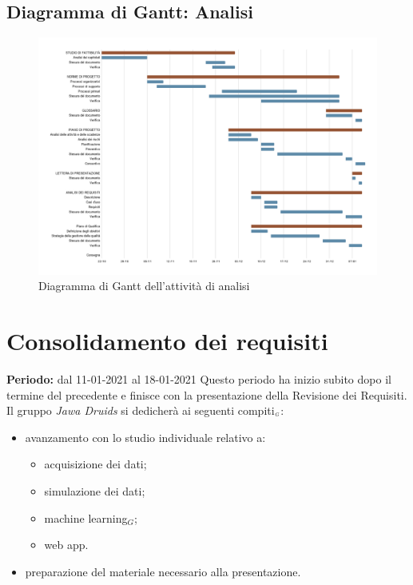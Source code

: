 \subsection{Diagramma di Gantt: Analisi}\label{PianificazioneDiagrammaDiGanttAnalisi}
\begin{figure}[!h]
	\begin{center}
		\includegraphics[width=1\linewidth]{../immagini/pdp/gantt_analisi.png}
		\caption{Diagramma di Gantt dell'attività di analisi}
	\end{center}
\end{figure}

\section{Consolidamento dei requisiti}\label{PianificazioneConsolidamentoDeiRequisiti}
\textbf{Periodo:} dal 11-01-2021 al 18-01-2021
Questo periodo ha inizio subito dopo il termine del precedente e finisce con la presentazione della Revisione dei Requisiti.
Il gruppo \textit{Jawa Druids} si dedicherà ai seguenti compiti$_{\scaleto{G}{3pt}}$:
\begin{itemize}
	\item avanzamento con lo studio individuale relativo a:
	\begin{itemize}
		\item acquisizione dei dati;
		\item simulazione dei dati;
		\item machine learning$_G$;
		\item web app.
	\end{itemize}
	\item preparazione del materiale necessario alla presentazione.
\end{itemize}

